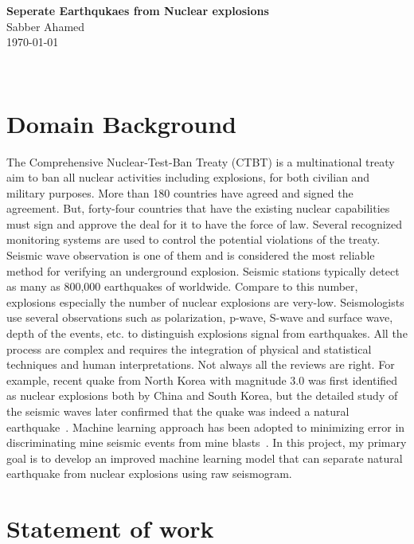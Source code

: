 \documentclass[12pt]{article}
\begin{document}
    \begin{minipage}[c]{1.0 \textwidth}
        \begin{center}
            \Large{\textbf{Seperate Earthqukaes from Nuclear explosions}}\\[0.5em]
            Sabber Ahamed\\
            \today
        \end{center}
    \end{minipage}\\[1.50em]
    
    \section{Domain Background}
        

    The Comprehensive Nuclear-Test-Ban Treaty (CTBT) is a multinational treaty aim to ban all nuclear activities including explosions, for both civilian and military purposes.  More than 180 countries have agreed and signed the agreement.  But, forty-four countries that have the existing nuclear capabilities must sign and approve the deal for it to have the force of law. Several recognized monitoring systems are used to control the potential violations of the treaty. Seismic wave observation is one of them and is considered the most reliable method for verifying an underground explosion. Seismic stations typically detect as many as 800,000 earthquakes of worldwide. Compare to this number, explosions especially the number of nuclear explosions are very-low. Seismologists use several observations such as polarization, p-wave, S-wave and surface wave, depth of the events, etc. to distinguish explosions signal from earthquakes. All the process are complex and requires the integration of physical and statistical techniques and human interpretations. Not always all the reviews are right. For example, recent quake from North Korea with magnitude 3.0 was first identified as nuclear explosions both by China and South Korea, but the detailed study of the seismic waves later confirmed that the quake was indeed a natural earthquake~\citep{telegraphNatural2017}. Machine learning approach has been adopted to minimizing error in discriminating mine seismic events from mine blasts~\citep{dong2016discrimination}. In this project, my primary goal is to develop an improved machine learning model that can separate natural earthquake from nuclear explosions using raw seismogram.

    \section{Statement of work}
\end{document}
